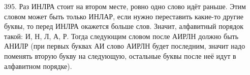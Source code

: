 395. Раз ИНЛРА стоит на втором месте, ровно одно слово идёт раньше. Этим словом может быть только ИНЛАР, если нужно переставить какие-то другие буквы, то перед ИНЛРА окажется больше слов. Значит, алфавитный порядок такой: И, Н, Л, А, Р. Тогда следующим словом после АИРЛН должно быть АНИЛР (при первых буквах АИ слово АИРЛН будет последним, значит надо поменять вторую букву на следующую, остальные буквы после неё идут в алфавитном порядке).\\
